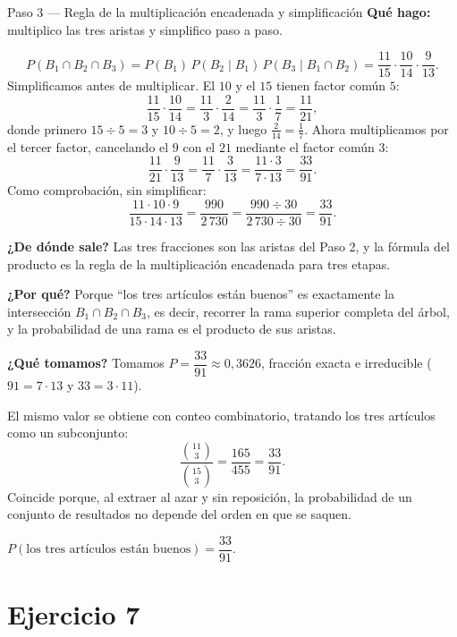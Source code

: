 \documentclass[11pt]{article}
\begin{document}
\begin{paso}{Paso 3 --- Regla de la multiplicación encadenada y simplificación}
\textbf{Qué hago:} multiplico las tres aristas y simplifico paso a paso.

\[
P(B_1\cap B_2\cap B_3)=P(B_1)\,P(B_2\mid B_1)\,P(B_3\mid B_1\cap B_2)
=\frac{11}{15}\cdot\frac{10}{14}\cdot\frac{9}{13}.
\]
Simplificamos antes de multiplicar. El $10$ y el $15$ tienen factor común $5$:
\[
\frac{11}{15}\cdot\frac{10}{14}=\frac{11}{3}\cdot\frac{2}{14}=\frac{11}{3}\cdot\frac{1}{7}=\frac{11}{21},
\]
donde primero $15\div 5=3$ y $10\div 5=2$, y luego $\tfrac{2}{14}=\tfrac17$. Ahora multiplicamos por el tercer factor, cancelando el $9$ con el $21$ mediante el factor común $3$:
\[
\frac{11}{21}\cdot\frac{9}{13}=\frac{11}{7}\cdot\frac{3}{13}=\frac{11\cdot 3}{7\cdot 13}=\frac{33}{91}.
\]
Como comprobación, sin simplificar:
\[
\frac{11\cdot 10\cdot 9}{15\cdot 14\cdot 13}=\frac{990}{2\,730}
=\frac{990\div 30}{2\,730\div 30}=\frac{33}{91}.
\]

\textbf{¿De dónde sale?} Las tres fracciones son las aristas del Paso 2, y la fórmula del producto es la regla de la multiplicación encadenada para tres etapas.

\textbf{¿Por qué?} Porque ``los tres artículos están buenos'' es exactamente la intersección $B_1\cap B_2\cap B_3$, es decir, recorrer la rama superior completa del árbol, y la probabilidad de una rama es el producto de sus aristas.

\textbf{¿Qué tomamos?} Tomamos $P=\dfrac{33}{91}\approx 0{,}3626$, fracción exacta e irreducible ($91=7\cdot 13$ y $33=3\cdot 11$).
\end{paso}

\begin{nota}
El mismo valor se obtiene con conteo combinatorio, tratando los tres artículos como un subconjunto:
\[
\frac{\binom{11}{3}}{\binom{15}{3}}=\frac{165}{455}=\frac{33}{91}.
\]
Coincide porque, al extraer al azar y sin reposición, la probabilidad de un conjunto de resultados no depende del orden en que se saquen.
\end{nota}

\begin{resp}
$P(\text{los tres artículos están buenos})=\dfrac{33}{91}$.
\end{resp}

\section*{Ejercicio 7}
\end{document}
